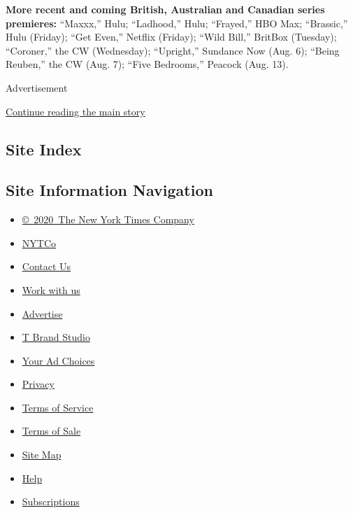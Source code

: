 \textbf{More recent and coming British, Australian and Canadian series
premieres:} ``Maxxx,'' Hulu; ``Ladhood,'' Hulu; ``Frayed,'' HBO Max;
``Brassic,'' Hulu (Friday); ``Get Even,'' Netflix (Friday); ``Wild
Bill,'' BritBox (Tuesday); ``Coroner,'' the CW (Wednesday); ``Upright,''
Sundance Now (Aug. 6); ``Being Reuben,'' the CW (Aug. 7); ``Five
Bedrooms,'' Peacock (Aug. 13).

Advertisement

\protect\hyperlink{after-bottom}{Continue reading the main story}

\hypertarget{site-index}{%
\subsection{Site Index}\label{site-index}}

\hypertarget{site-information-navigation}{%
\subsection{Site Information
Navigation}\label{site-information-navigation}}

\begin{itemize}
\tightlist
\item
  \href{https://help.nytimes3xbfgragh.onion/hc/en-us/articles/115014792127-Copyright-notice}{©~2020~The
  New York Times Company}
\end{itemize}

\begin{itemize}
\tightlist
\item
  \href{https://www.nytco.com/}{NYTCo}
\item
  \href{https://help.nytimes3xbfgragh.onion/hc/en-us/articles/115015385887-Contact-Us}{Contact
  Us}
\item
  \href{https://www.nytco.com/careers/}{Work with us}
\item
  \href{https://nytmediakit.com/}{Advertise}
\item
  \href{http://www.tbrandstudio.com/}{T Brand Studio}
\item
  \href{https://www.nytimes3xbfgragh.onion/privacy/cookie-policy\#how-do-i-manage-trackers}{Your
  Ad Choices}
\item
  \href{https://www.nytimes3xbfgragh.onion/privacy}{Privacy}
\item
  \href{https://help.nytimes3xbfgragh.onion/hc/en-us/articles/115014893428-Terms-of-service}{Terms
  of Service}
\item
  \href{https://help.nytimes3xbfgragh.onion/hc/en-us/articles/115014893968-Terms-of-sale}{Terms
  of Sale}
\item
  \href{https://spiderbites.nytimes3xbfgragh.onion}{Site Map}
\item
  \href{https://help.nytimes3xbfgragh.onion/hc/en-us}{Help}
\item
  \href{https://www.nytimes3xbfgragh.onion/subscription?campaignId=37WXW}{Subscriptions}
\end{itemize}
